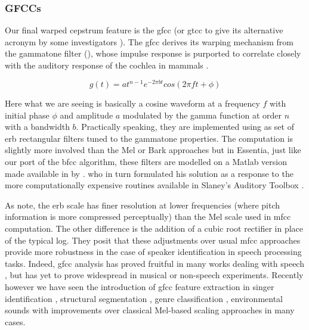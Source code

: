 {{{{\subsubsection{GFCCs}

Our final warped cepstrum feature is the \acrshort{gfcc} (or \acrshort{gtcc} to give its alternative acronym by some investigators \citep{Valero2012, Fathima2013}). The \acrshort{gfcc} derives its warping mechanism from the gammatone filter (), whose impulse response is purported to correlate closely with the auditory response of the cochlea in mammals \citep{Patterson1987, Valero2012}.

\begin{equation}
\label{eq:gammatone}	
g(t)=at^{n-1}e^{-2\pi bt}cos(2\pi ft + \phi)
\end{equation}

Here what we are seeing is basically a cosine waveform at a frequency $f$ with initial phase $\phi$ and amplitude $a$ modulated by the gamma function at order $n$ with a bandwidth $b$. Practically speaking, they are implemented using as set of \acrshort{erb} rectangular filters tuned to the gammatone properties. The computation is slightly more involved than the Mel or Bark approaches but in  Essentia, just like our port of the \acrshort{bfcc} algorithm, these filters are  modelled on a Matlab version made available in by \cite{Ellis2009}. who in turn formulated his solution as a response to the more computationally expensive routines available in Slaney's Auditory Toolbox \citep{Slaney1998}. 

 As \cite{Zhao2013} note, the \acrshort{erb} scale has finer resolution at lower frequencies (where pitch information is more compressed perceptually) than the Mel scale used in \acrshort{mfcc} computation. The other difference is the addition of a cubic root rectifier in place of the typical log. They posit that these adjustments over usual \acrshort{mfcc} approaches provide more robustness in the case of speaker identification in speech processing tasks. Indeed, \acrshort{gfcc} analysis has proved fruitful in many works dealing with speech \citep{Abdulla2002, Schl2007}, but has yet to prove widespread in musical or non-speech experiments. Recently however we have seen the introduction of \acrshort{gfcc} feature extraction in singer identification \citep{Cai2011}, structural segmentation \citep{Tian2016}, genre classification \citep{Johnson-Roberson2017, Grekow2017}, environmental sounds \citep{Valero2012} with improvements over classical Mel-based scaling approaches in many cases. 


}}}}
